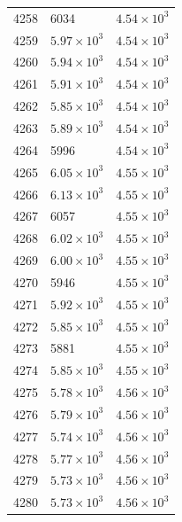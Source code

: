 \begin{table}[H]
\begin{tabular}{lll}
4258 & 6034 & $\displaystyle 4.54 \times 10^{3}$ \\
4259 & $\displaystyle 5.97 \times 10^{3}$ & $\displaystyle 4.54 \times 10^{3}$ \\
4260 & $\displaystyle 5.94 \times 10^{3}$ & $\displaystyle 4.54 \times 10^{3}$ \\
4261 & $\displaystyle 5.91 \times 10^{3}$ & $\displaystyle 4.54 \times 10^{3}$ \\
4262 & $\displaystyle 5.85 \times 10^{3}$ & $\displaystyle 4.54 \times 10^{3}$ \\
4263 & $\displaystyle 5.89 \times 10^{3}$ & $\displaystyle 4.54 \times 10^{3}$ \\
4264 & 5996 & $\displaystyle 4.54 \times 10^{3}$ \\
4265 & $\displaystyle 6.05 \times 10^{3}$ & $\displaystyle 4.55 \times 10^{3}$ \\
4266 & $\displaystyle 6.13 \times 10^{3}$ & $\displaystyle 4.55 \times 10^{3}$ \\
4267 & 6057 & $\displaystyle 4.55 \times 10^{3}$ \\
4268 & $\displaystyle 6.02 \times 10^{3}$ & $\displaystyle 4.55 \times 10^{3}$ \\
4269 & $\displaystyle 6.00 \times 10^{3}$ & $\displaystyle 4.55 \times 10^{3}$ \\
4270 & 5946 & $\displaystyle 4.55 \times 10^{3}$ \\
4271 & $\displaystyle 5.92 \times 10^{3}$ & $\displaystyle 4.55 \times 10^{3}$ \\
4272 & $\displaystyle 5.85 \times 10^{3}$ & $\displaystyle 4.55 \times 10^{3}$ \\
4273 & 5881 & $\displaystyle 4.55 \times 10^{3}$ \\
4274 & $\displaystyle 5.85 \times 10^{3}$ & $\displaystyle 4.55 \times 10^{3}$ \\
4275 & $\displaystyle 5.78 \times 10^{3}$ & $\displaystyle 4.56 \times 10^{3}$ \\
4276 & $\displaystyle 5.79 \times 10^{3}$ & $\displaystyle 4.56 \times 10^{3}$ \\
4277 & $\displaystyle 5.74 \times 10^{3}$ & $\displaystyle 4.56 \times 10^{3}$ \\
4278 & $\displaystyle 5.77 \times 10^{3}$ & $\displaystyle 4.56 \times 10^{3}$ \\
4279 & $\displaystyle 5.73 \times 10^{3}$ & $\displaystyle 4.56 \times 10^{3}$ \\
4280 & $\displaystyle 5.73 \times 10^{3}$ & $\displaystyle 4.56 \times 10^{3}$ \\

\end{tabular}
\end{table}
